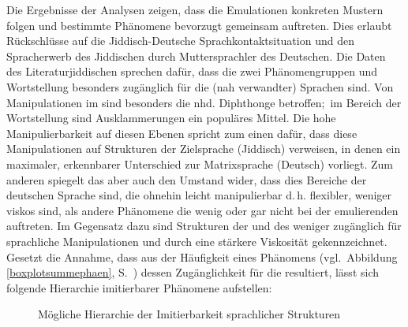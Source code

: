 \noindent Die Ergebnisse der Analysen zeigen, dass die Emulationen konkreten Mustern folgen und bestimmte Phänomene bevorzugt gemeinsam auftreten. Dies erlaubt Rückschlüsse auf die Jiddisch-Deutsche Sprachkontaktsituation und den Spracherwerb des Jiddischen durch Muttersprachler des Deutschen. Die Daten des Literaturjiddischen sprechen dafür, dass die zwei Phänomengruppen  und Wortstellung besonders zugänglich für die  (nah verwandter) Sprachen sind. Von Manipulationen im  sind besonders die nhd. Diphthonge betroffen;\, im Bereich der Wortstellung sind Ausklammerungen ein populäres Mittel. 
Die hohe Manipulierbarkeit auf diesen Ebenen spricht zum einen dafür, dass diese Manipulationen auf Strukturen der Zielsprache (Jiddisch) verweisen, in denen ein maximaler, erkennbarer Unterschied zur Matrixsprache (Deutsch) vorliegt. Zum anderen spiegelt das aber auch den Umstand wider, dass dies Bereiche der deutschen Sprache sind, die ohnehin leicht manipulierbar d.\,h. flexibler, weniger viskos sind, als andere Phänomene die wenig oder gar nicht bei der emulierenden  auftreten. Im Gegensatz dazu sind Strukturen der  und des  weniger zugänglich für sprachliche Manipulationen und durch eine stärkere Viskosität gekennzeichnet. Gesetzt die Annahme, dass aus der Häufigkeit eines Phänomens (vgl.\, Abbildung \ref{boxplotsummephaen}, S.\, \pageref{boxplotsummephaen}) dessen Zugänglichkeit für die  resultiert, lässt sich folgende Hierarchie imitierbarer Phänomene aufstellen: \\
  
 
\begin{figure}
 
 \caption{Mögliche Hierarchie der Imitierbarkeit sprachlicher Strukturen}\label{hierarchieIMITATION}
 \end{figure}

